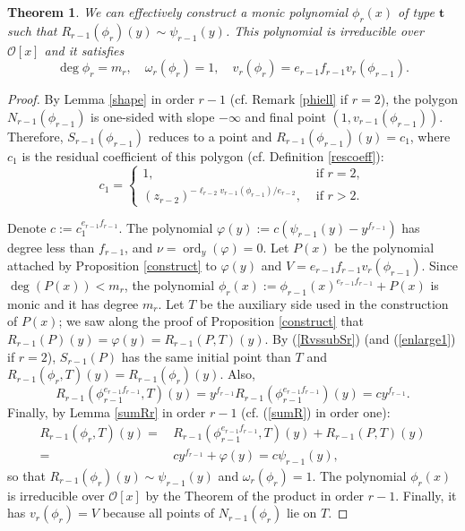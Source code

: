 \documentclass{amsart}
\newtheorem{theorem}{Theorem}[section]
\def\op{\operatorname}
\def\dg{\op{deg}}
\def\om{\omega}
\def\oo{{\mathcal O}}
\def\ord{\op{ord}}
\def\ty{\mathbf{t}}
\def\zpx{\oo[x]}
\begin{document}
\begin{theorem}\label{phir}
We can effectively construct a monic polynomial $\phi_r(x)$ of type $\ty$ such that $R_{r-1}(\phi_r)(y)\sim\psi_{r-1}(y)$. This polynomial is irreducible over $\zpx$ and it satisfies 
\begin{equation}\label{vrphir}
 \dg \phi_r=m_r,\quad \om_r(\phi_r)=1,\quad  v_r(\phi_r)=e_{r-1}f_{r-1}v_r(\phi_{r-1}).
\end{equation}
\end{theorem}

\begin{proof}
By Lemma \ref{shape} in order $r-1$ (cf. Remark \ref{phiell} if $r=2$), the polygon $N_{r-1}(\phi_{r-1})$ is one-sided with slope $-\infty$ and final point $(1,v_{r-1}(\phi_{r-1}))$. Therefore, $S_{r-1}(\phi_{r-1})$ reduces to a point and $R_{r-1}(\phi_{r-1})(y)=c_1$, where $c_1$ is the residual coefficient of this polygon (cf. Definition \ref{rescoeff}):
$$
c_1=\left\{\begin{array}{ll}
1,&\mbox{ if }r=2,\\(z_{r-2})^{-\ell_{r-2}v_{r-1}(\phi_{r-1})/e_{r-2}},&\mbox{ if }r>2.
\end{array}
\right.
$$

Denote $c:=c_1^{e_{r-1}f_{r-1}}$. The polynomial $\varphi(y):=c(\psi_{r-1}(y)-y^{f_{r-1}})$ has degree less than $f_{r-1}$, and $\nu=\ord_y(\varphi)=0$. Let $P(x)$ be the polynomial attached by Proposition \ref{construct} to $\varphi(y)$ and $V=e_{r-1}f_{r-1}v_r(\phi_{r-1})$.
Since $\dg(P(x))<m_r$, the polynomial $\phi_r(x):=\phi_{r-1}(x)^{e_{r-1}f_{r-1}}+P(x)$ is monic and it has degree $m_r$.
Let $T$ be the auxiliary side used in the construction of $P(x)$; we saw along the proof of Proposition \ref{construct} that $R_{r-1}(P)(y)=\varphi(y)=R_{r-1}(P,T)(y)$. By (\ref{RvssubSr}) (and (\ref{enlarge1}) if $r=2$), $S_{r-1}(P)$ has the same initial point than $T$ and $R_{r-1}(\phi_r,T)(y)=R_{r-1}(\phi_r)(y)$. Also, 
$$R_{r-1}(\phi_{r-1}^{e_{r-1}f_{r-1}},T)(y)=y^{f_{r-1}}R_{r-1}(\phi_{r-1}^{e_{r-1}f_{r-1}})(y)=cy^{f_{r-1}}.
$$ Finally, by Lemma \ref{sumRr} in order $r-1$ (cf. (\ref{sumR}) in order one):
\begin{align*}
R_{r-1}(\phi_r,T)(y)=&\,R_{r-1}(\phi_{r-1}^{e_{r-1}f_{r-1}},T)(y)+R_{r-1}(P,T)(y)\\=&\,cy^{f_{r-1}}+\varphi(y)=c\psi_{r-1}(y),
\end{align*}
so that $R_{r-1}(\phi_r)(y)\sim \psi_{r-1}(y)$ and $\om_r(\phi_r)=1$. The polynomial $\phi_r(x)$ is irreducible over $\zpx$ by the Theorem of the product in order $r-1$. Finally, it has $v_r(\phi_r)=V$ because all points of $N_{r-1}(\phi_r)$ lie on $T$.
\end{proof}
\end{document}
